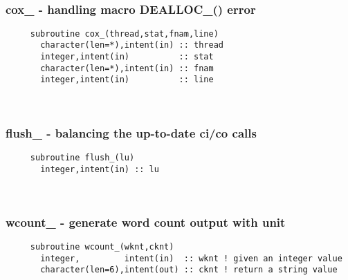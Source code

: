  
\mbox{}\hrulefill\ 
 
  \subsubsection{cox\_ - handling macro DEALLOC\_() error}

\begin{verbatim} 
     subroutine cox_(thread,stat,fnam,line)
       character(len=*),intent(in) :: thread
       integer,intent(in)          :: stat
       character(len=*),intent(in) :: fnam
       integer,intent(in)          :: line
 \end{verbatim}%
 
 
\mbox{}\hrulefill\ 
 
  \subsubsection{flush\_ - balancing the up-to-date ci/co calls}

\begin{verbatim} 
     subroutine flush_(lu)
       integer,intent(in) :: lu
 \end{verbatim}%
 
 
\mbox{}\hrulefill\ 
 
  \subsubsection{wcount\_ - generate word count output with unit}

\begin{verbatim} 
     subroutine wcount_(wknt,cknt)
       integer,         intent(in)  :: wknt ! given an integer value
       character(len=6),intent(out) :: cknt ! return a string value
 \end{verbatim}%
 
